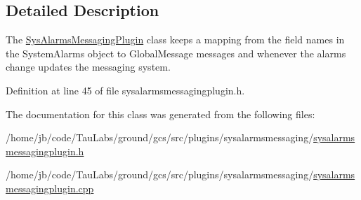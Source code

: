 \subsection{\-Detailed \-Description}
\-The \hyperlink{class_sys_alarms_messaging_plugin}{\-Sys\-Alarms\-Messaging\-Plugin} class keeps a mapping from the field names in the \-System\-Alarms object to \-Global\-Message messages and whenever the alarms change updates the messaging system. 

\-Definition at line 45 of file sysalarmsmessagingplugin.\-h.



\-The documentation for this class was generated from the following files\-:\begin{DoxyCompactItemize}
\item 
/home/jb/code/\-Tau\-Labs/ground/gcs/src/plugins/sysalarmsmessaging/\hyperlink{sysalarmsmessagingplugin_8h}{sysalarmsmessagingplugin.\-h}\item 
/home/jb/code/\-Tau\-Labs/ground/gcs/src/plugins/sysalarmsmessaging/\hyperlink{sysalarmsmessagingplugin_8cpp}{sysalarmsmessagingplugin.\-cpp}\end{DoxyCompactItemize}
